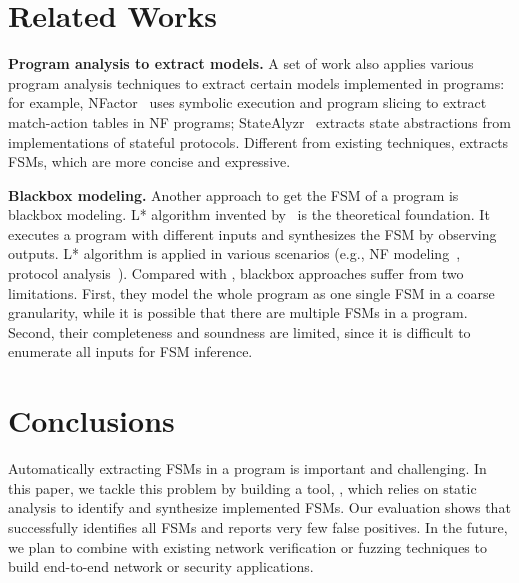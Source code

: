 \section{Related Works}
\label{sec:related}

\noindent\textbf{Program analysis to extract models.} 
A set of work also applies various program analysis techniques 
to extract certain models implemented in programs: 
for example, NFactor~\cite{wu2016automatic} 
uses symbolic execution and program slicing to extract match-action 
tables in NF programs; 
StateAlyzr~\cite{khalid2016paving} extracts state abstractions 
from implementations of stateful protocols. 
Different from existing techniques, \Tool{} extracts FSMs, 
which are more concise and expressive.

\noindent\textbf{Blackbox modeling.} 
Another approach to get the FSM of a program is blackbox modeling. 
L* algorithm invented by~\citet{angluin1987learning} 
is the theoretical foundation.
It executes a program with different inputs and 
synthesizes the FSM by observing outputs.  
L* algorithm is applied in various scenarios 
(e.g., NF modeling~\cite{moon2019alembic}, 
protocol analysis~\cite{cho2011mace}). 
Compared with \Tool{}, blackbox approaches suffer from two limitations. 
First, they model the whole program as one single FSM in a coarse granularity, 
while it is possible that there are multiple FSMs in a program. 
Second, their completeness and soundness are limited, 
since it is difficult to enumerate all inputs for 
FSM inference.



\section{Conclusions}

Automatically extracting FSMs in a program is important 
and challenging. 
In this paper, we tackle this problem by building a tool, \Tool{}, 
which relies on static analysis to identify and synthesize implemented FSMs. 
Our evaluation shows that \Tool{} successfully identifies all FSMs and 
reports very few false positives. 
In the future, we plan to combine \Tool{} with existing network verification 
or fuzzing techniques to build end-to-end network or security applications. 
